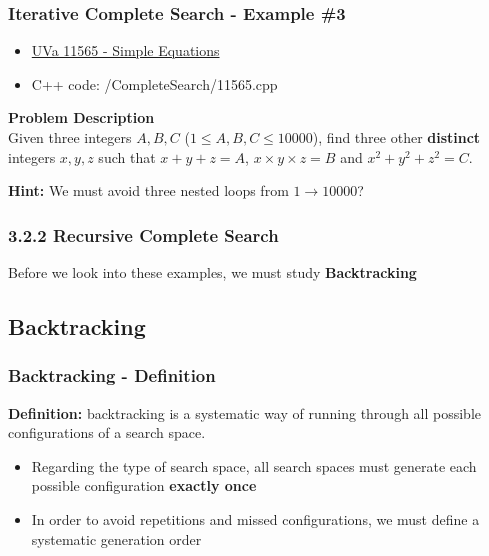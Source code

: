 \documentclass{beamer}
\begin{document}
\begin{frame}[fragile]
\frametitle{Iterative Complete Search - Example \#3}

\begin{itemize}
    \item \href{https://onlinejudge.org/index.php?option=com_onlinejudge&Itemid=8&category=27&page=show_problem&problem=2612}{UVa 11565 - Simple Equations}
    \item C++ code: \color{red}/CompleteSearch/11565.cpp\color{black}
\end{itemize}

\vspace{0.5cm}

\color{red}\textbf{Problem Description}\color{black}\\

Given three integers $A,B,C$ ($1 \leq A,B,C \leq 10000$), find three other \textbf{distinct} integers $x,y,z$ such that $x+y+z=A$, $x\times y\times z=B$ and $x^2 + y^2 + z^2=C$.

\vspace{0.5cm}

\textbf{Hint:} We must avoid three nested loops from $1 \rightarrow 10000$?

\end{frame}

\begin{frame}[fragile]
\frametitle{3.2.2 Recursive Complete Search}

Before we look into these examples, we must study \color{blue}\textbf{Backtracking}\color{black}

\end{frame}

\subsection{Backtracking}
\begin{frame}[fragile]
\frametitle{Backtracking - Definition}

\textbf{Definition:} backtracking is a systematic way of running through all possible configurations of a search space. 

\vspace{0.3cm}

\begin{itemize}
    \item Regarding the type of search space, all search spaces must generate each possible configuration \textbf{exactly once}
    \item In order to avoid repetitions and missed configurations, we must define a systematic generation order
\end{itemize} 
\end{frame}
\end{document}
